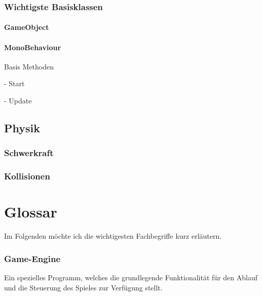 \subsubsection{Wichtigste Basisklassen}

\paragraph{GameObject}

\paragraph{MonoBehaviour}

Basis Methoden

- Start

- Update

\subsection{Physik}

\subsubsection{Schwerkraft}

\subsubsection{Kollisionen}
\label{subsubsec:collider}

\section{Glossar}

Im Folgenden möchte ich die wichtigesten Fachbegriffe kurz erläutern. \cite{unity3dglossary}

\subsubsection{Game-Engine}
Ein spezielles Programm, welches die grundlegende Funktionalität für den Ablauf und die Steuerung des Spieles zur Verfügung stellt.



